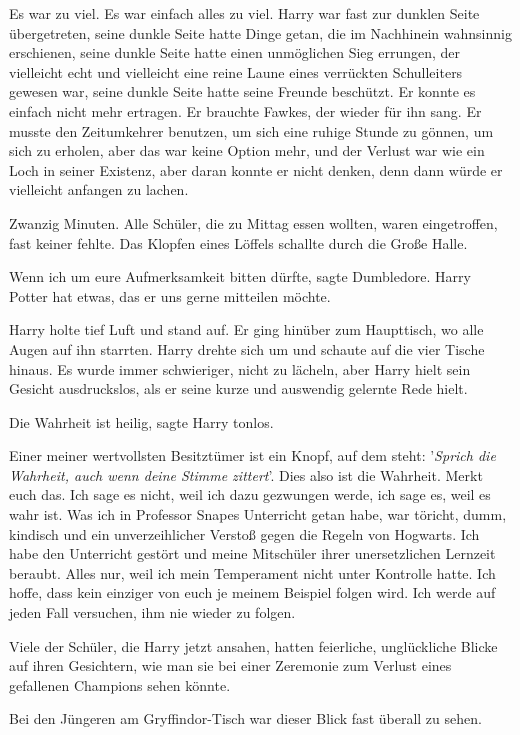 Es war zu viel. Es war einfach alles zu viel. Harry war fast zur dunklen Seite
übergetreten, seine dunkle Seite hatte Dinge getan, die im Nachhinein wahnsinnig
erschienen, seine dunkle Seite hatte einen unmöglichen Sieg errungen, der
vielleicht echt und vielleicht eine reine Laune eines verrückten Schulleiters
gewesen war, seine dunkle Seite hatte seine Freunde beschützt. Er konnte es
einfach nicht mehr ertragen. Er brauchte Fawkes, der wieder für ihn sang. Er
musste den Zeitumkehrer benutzen, um sich eine ruhige Stunde zu gönnen, um sich
zu erholen, aber das war keine Option mehr, und der Verlust war wie ein Loch in
seiner Existenz, aber daran konnte er nicht denken, denn dann würde er
vielleicht anfangen zu lachen.

Zwanzig Minuten. Alle Schüler, die zu Mittag essen wollten, waren eingetroffen,
fast keiner fehlte. Das Klopfen eines Löffels schallte durch die Große Halle.

\glqq{}Wenn ich um eure Aufmerksamkeit bitten dürfte\grqq{}, sagte Dumbledore.
\glqq{}Harry Potter hat etwas, das er uns gerne mitteilen möchte.\grqq{}

Harry holte tief Luft und stand auf. Er ging hinüber zum Haupttisch, wo alle
Augen auf ihn starrten. Harry drehte sich um und schaute auf die vier Tische
hinaus. Es wurde immer schwieriger, nicht zu lächeln, aber Harry hielt sein
Gesicht ausdruckslos, als er seine kurze und auswendig gelernte Rede hielt.

\glqq{}Die Wahrheit ist heilig\grqq{}, sagte Harry tonlos.

\glqq{}Einer meiner wertvollsten Besitztümer ist ein Knopf, auf dem steht:
'\emph{Sprich die Wahrheit, auch wenn deine Stimme zittert}'. Dies also ist die
Wahrheit. Merkt euch das. Ich sage es nicht, weil ich dazu gezwungen werde, ich
sage es, weil es wahr ist. Was ich in Professor Snapes Unterricht getan habe,
war töricht, dumm, kindisch und ein unverzeihlicher Verstoß gegen die Regeln von
Hogwarts. Ich habe den Unterricht gestört und meine Mitschüler ihrer
unersetzlichen Lernzeit beraubt. Alles nur, weil ich mein Temperament nicht
unter Kontrolle hatte. Ich hoffe, dass kein einziger von euch je meinem Beispiel
folgen wird. Ich werde auf jeden Fall versuchen, ihm nie wieder zu
folgen.\grqq{}

Viele der Schüler, die Harry jetzt ansahen, hatten feierliche, unglückliche
Blicke auf ihren Gesichtern, wie man sie bei einer Zeremonie zum Verlust eines
gefallenen Champions sehen könnte.

Bei den Jüngeren am Gryffindor-Tisch war dieser Blick fast überall zu sehen.

